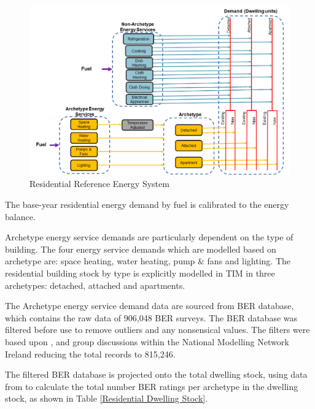 \documentclass[gmd,manuscript]{copernicus}
\begin{document}
\begin{figure}[hb!]
 \centering
 \includegraphics[scale=0.55]{figures/TIM_Residential_RES.png} 
 \caption{Residential Reference Energy System}
 \label{fig:TIM_RES}
\end{figure}

The base-year residential energy demand by fuel is calibrated to the \citet{SEAI2019} energy balance.

Archetype energy service demands are particularly dependent on the type of building. The four energy service demands which are modelled based on archetype are: space heating, water heating, pump \& fans and lighting. The residential building stock by type is explicitly modelled in TIM in three archetypes: detached, attached and apartments. 

The Archetype energy service demand data are sourced from \citet{SustainableEnergyAuthorityofIreland} BER database, which contains the raw data of 906,048 BER surveys. The BER database was filtered before use to remove outliers and any nonsensical values. The filters were based upon \citet{Dineen2015}, \citet{Uidhir2020a} and group discussions within the National Modelling Network Ireland reducing the total records to 815,246.

The filtered BER database is projected onto the total dwelling stock, using data from \citet{CSO2020E1008, CSO2020E1055} to calculate the total number BER ratings per archetype in the dwelling stock, as shown in Table \ref{Residential Dwelling Stock}. 
\end{document}
